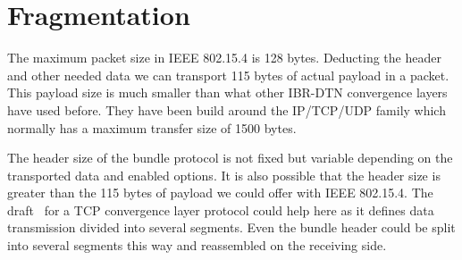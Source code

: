\section{Fragmentation}

The maximum packet size in IEEE 802.15.4 is 128 bytes. Deducting the header
and other needed data we can transport 115 bytes of actual payload in a
packet. This payload size is much smaller than what other IBR-DTN convergence
layers have used before. They have been build around the IP/TCP/UDP family which
normally has a maximum transfer size of 1500 bytes.

The header size of the bundle protocol is not fixed but variable depending on
the transported data and enabled options. It is also possible that the header
size is greater than the 115 bytes of payload we could offer with IEEE 802.15.4. The
draft~\cite{tcp-clayer-draft} for a TCP convergence layer protocol could help here as it
defines data transmission divided into several segments. Even the bundle
header could be split into several segments this way and reassembled on the
receiving side.


